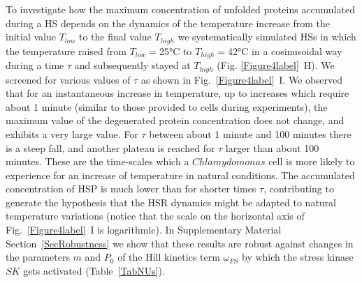 \documentclass[oneside, 10pt, a4paper, twocolumn]{article}
\begin{document}
To investigate how the maximum concentration of unfolded proteins accumulated during a HS depends on the dynamics of the  temperature increase from the initial value $T_{low}$ to the final value $T_{high}$ we systematically simulated HSs in which the temperature raised from $T_{low}=$25°C to $T_{high}=$42°C in a cosinusoidal way during a time  $\tau$ and subsequently stayed at $T_{high}$ (Fig. \ref{Figure4label}~H). 
We screened for various values of   $\tau$ as shown  in Fig.~\ref{Figure4label}~I. We observed that for an instantaneous increase in temperature, up to increases which require about 1 minute (similar to those provided to cells during experiments), the maximum value of the degenerated protein concentration  does not change, and exhibits a very large value. For $\tau$ between about 1 minute and 100 minutes there is a steep fall, and another plateau is reached for $\tau$ larger than about 100 minutes. These are the time-scales which a $Chlamydomonas$ cell is more likely to experience for an increase of temperature in natural conditions. The accumulated concentration of HSP is much lower than for shorter times $\tau$, {contributing to generate the hypothesis that the HSR dynamics might be adapted to natural temperature variations} %
(notice that the scale on the horizontal axis of Fig.~\ref{Figure4label}~I is logarithmic). 
{In Supplementary Material Section~\ref{SecRobustness} we show that these results are robust against changes in the parameters $m$ and $P_0$ of the Hill kinetics term $\omega_{PS}$ by which the stress kinase $SK$ gets activated (Table~\ref{TabNUs}).}
\end{document}
